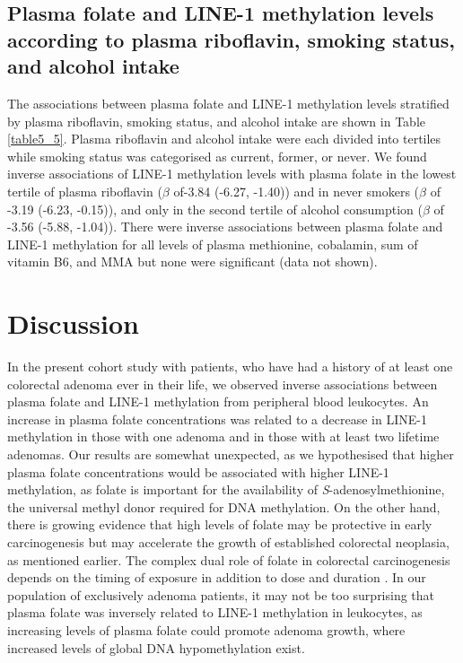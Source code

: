 \subsection{Plasma folate and LINE-1 methylation levels according to plasma riboflavin, smoking status, and alcohol intake} %
\noindent The associations between plasma folate and LINE-1 methylation levels stratified by plasma riboflavin, smoking status, and alcohol intake are shown in Table \ref{table5_5}. Plasma riboflavin and alcohol intake were each divided into tertiles while smoking status was categorised as current, former, or never. We found inverse associations of LINE-1 methylation levels with plasma folate in the lowest tertile of plasma riboflavin ($\beta$ of-3.84 (-6.27, -1.40)) and in never smokers ($\beta$ of -3.19 (-6.23, -0.15)), and only in the second tertile of alcohol consumption ($\beta$ of -3.56 (-5.88, -1.04)). There were inverse associations between plasma folate and LINE-1 methylation for all levels of plasma methionine, cobalamin, sum of vitamin B6, and MMA but none were significant (data not shown).

\section{Discussion} %
\noindent In the present cohort study with patients, who have had a history of at least one colorectal adenoma ever in their life, we observed inverse associations between plasma folate and LINE-1 methylation from peripheral blood leukocytes. An increase in plasma folate concentrations was related to a decrease in LINE-1 methylation in those with one adenoma and in those with at least two lifetime adenomas. Our results are somewhat unexpected, as we hypothesised that higher plasma folate concentrations would be associated with higher LINE-1 methylation, as folate is important for the availability of \emph{S}-adenosylmethionine, the universal methyl donor required for DNA methylation. On the other hand, there is growing evidence that high levels of folate may be protective in early carcinogenesis but may accelerate the growth of established colorectal neoplasia, as mentioned earlier. The complex dual role of folate in colorectal carcinogenesis depends on the timing of exposure in addition to dose and duration \cite{c541,c542,c550,c551}. In our population of exclusively adenoma patients, it may not be too surprising that plasma folate was inversely related to LINE-1 methylation in leukocytes, as increasing levels of plasma folate could promote adenoma growth, where increased levels of global DNA hypomethylation exist.

